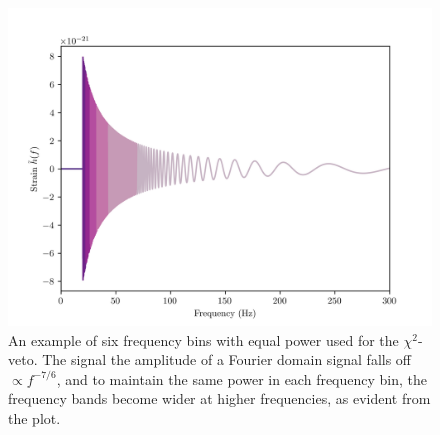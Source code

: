 \begin{figure}
    \centering
    \includegraphics[width=\textwidth]{figures/basic_data_analysis/chissq_bins.png}
    \caption{An example of six frequency bins with equal power used for the $\chi^2$-veto. The signal the amplitude of a Fourier domain signal falls off $\propto f^{-7/6}$, and to maintain the same power in each frequency bin, the frequency bands become wider at higher frequencies, as evident from the plot.}
    \label{fig:chisq_bins}
\end{figure}

